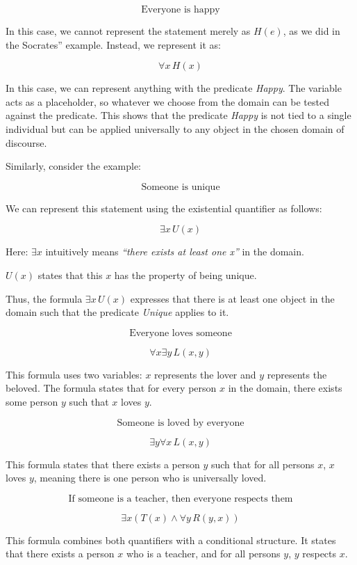 \documentclass[12pt,a4paper,openany]{article}
\begin{document}
\[\text{Everyone is happy}\]

In this case, we cannot represent the statement merely as \(H(e)\), as
we did in the Socrates'' example. Instead, we represent it as:

\[\forall x \, H(x)\]

In this case, we can represent anything with the predicate \emph{Happy}.
The variable acts as a placeholder, so whatever we choose from the
domain can be tested against the predicate. This shows that the
predicate \emph{Happy} is not tied to a single individual but can be
applied universally to any object in the chosen domain of discourse.

Similarly, consider the example:

\[\text{Someone is unique}\]

We can represent this statement using the existential quantifier as
follows:

\[\exists x \, U(x)\]

Here:  \(\exists x\) intuitively means \emph{``there exists at least
one x''} in the domain.

\(U(x)\) states that this \(x\) has the property of being unique.

Thus, the formula \(\exists x \, U(x)\) expresses that there is at least
one object in the domain such that the predicate \emph{Unique} applies
to it.

\[\text{Everyone loves someone}\]

\[\forall x \exists y \, L(x,y)\]

This formula uses two variables: \(x\) represents the lover and \(y\)
represents the beloved. The formula states that for every person \(x\)
in the domain, there exists some person \(y\) such that \(x\) loves
\(y\).

\[\text{Someone is loved by everyone}\]

\[\exists y \forall x \, L(x,y)\]

This formula states that there exists a person \(y\) such that for all
persons \(x\), \(x\) loves \(y\), meaning there is one person who is
universally loved.

\[\text{If someone is a teacher, then everyone respects them}\]

\[\exists x (T(x) \land \forall y \, R(y,x))\]

This formula combines both quantifiers with a conditional structure. It
states that there exists a person \(x\) who is a teacher, and for all
persons \(y\), \(y\) respects \(x\).
\end{document}
